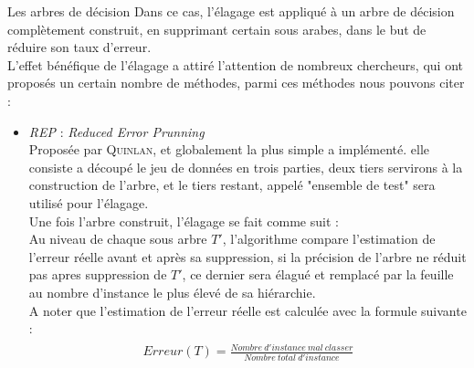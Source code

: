 \documentclass[a4paper, 11pt]{report}
\begin{document}
\begin{chapter}{Les arbres de décision}
Dans ce cas, l'élagage est appliqué à un arbre de décision complètement construit, en supprimant certain sous arabes, dans le but de réduire son taux d'erreur.\\
L'effet bénéfique de l'élagage a attiré l'attention de nombreux chercheurs, qui ont proposés un certain nombre de méthodes\cite{esposito1997comparative}, parmi ces méthodes nous pouvons citer : \\
\begin{itemize}
\item \emph{REP} : \emph{Reduced Error Prunning}\\
Proposée par \textsc{Quinlan}, et globalement la plus simple a implémenté\cite{quinlan1987simplifying}. elle consiste a découpé le jeu de données en trois parties, deux tiers servirons à la construction de l'arbre, et le tiers restant, appelé "ensemble de test" sera utilisé pour l'élagage.\\
Une fois l'arbre construit, l'élagage se fait comme suit :\\
Au niveau de chaque sous arbre $T'$, l'algorithme compare l'estimation de l'erreur réelle avant et après sa suppression, si la précision de l'arbre ne réduit pas apres suppression de $T'$, ce dernier sera élagué et remplacé par la feuille au nombre d'instance le plus élevé de sa hiérarchie.\\
A noter que l'estimation de l'erreur réelle est calculée avec la formule suivante : \\
\begin{align}
\begin{split}\label{formule:InfoSplit}
Erreur(T) = \frac{Nombre\ d'instance\ mal\ classer}{Nombre\ total\ d'instance}
\end{split}
\end{align}
\end{itemize}







\end{chapter}
\end{document}
